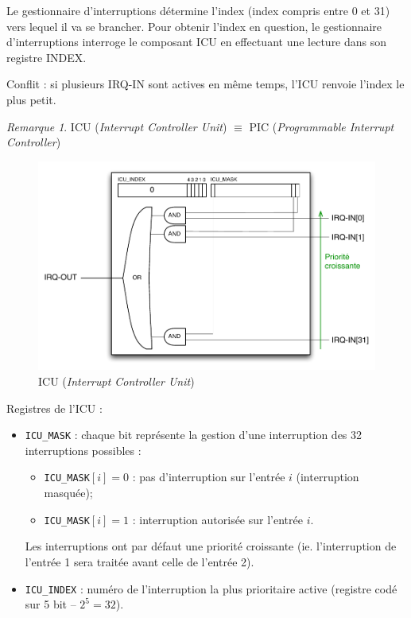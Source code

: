 \documentclass[11pt,english,french]{scrreprt}
\theoremstyle{remark}
\newtheorem*{rem*}{Remarque}
\theoremstyle{definition}
\begin{document}
Le gestionnaire d'interruptions détermine l'index (index compris entre 0 et 31) vers lequel il va se brancher. Pour obtenir l'index en question, le gestionnaire d'interruptions interroge le composant ICU en effectuant une lecture dans son registre INDEX.

Conflit : si plusieurs IRQ-IN sont actives en même temps, l'ICU renvoie l'index le plus petit.

\begin{rem*}
	ICU (\emph{Interrupt Controller Unit}) $\equiv$ PIC (\emph{Programmable Interrupt Controller})
\end{rem*}

\begin{figure}[!h]
	\center
	\includegraphics[scale=.5]{diagrammes/ICU}
	\caption{ICU (\emph{Interrupt Controller Unit})}
\end{figure}

Registres de l'ICU : \begin{itemize}
	\item \lstinline!ICU_MASK! : chaque bit représente la gestion d'une interruption des 32 interruptions possibles : \begin{itemize}
		\item \lstinline!ICU_MASK!$[i] = 0$ : pas d'interruption sur l'entrée $i$ (interruption masquée);
		\item \lstinline!ICU_MASK!$[i] = 1$ : interruption autorisée sur l'entrée $i$. 
	\end{itemize}
	Les interruptions ont par défaut une priorité croissante (ie. l'interruption de l'entrée 1 sera traitée avant celle de l'entrée 2).
	\item \lstinline!ICU_INDEX! : numéro de l'interruption la plus prioritaire active (registre codé sur 5 bit -- $2^5=32$).
\end{itemize}
\end{document}

